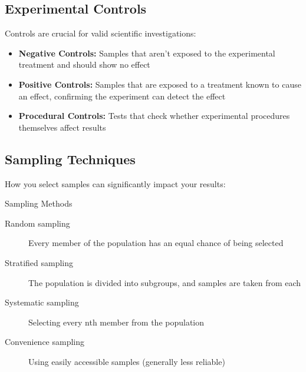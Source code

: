 
\subsection{Experimental Controls}

Controls are crucial for valid scientific investigations:

\begin{itemize}
    \item \textbf{Negative Controls:} Samples that aren't exposed to the experimental treatment and should show no effect
    
    \item \textbf{Positive Controls:} Samples that are exposed to a treatment known to cause an effect, confirming the experiment can detect the effect
    
    \item \textbf{Procedural Controls:} Tests that check whether experimental procedures themselves affect results
\end{itemize}

    \centering


\subsection{Sampling Techniques}

How you select samples can significantly impact your results:

\begin{keyconcept}{Sampling Methods}
\begin{description}
    \item[Random sampling] Every member of the population has an equal chance of being selected
    \item[Stratified sampling] The population is divided into subgroups, and samples are taken from each
    \item[Systematic sampling] Selecting every nth member from the population
    \item[Convenience sampling] Using easily accessible samples (generally less reliable)
\end{description}
\end{keyconcept}

